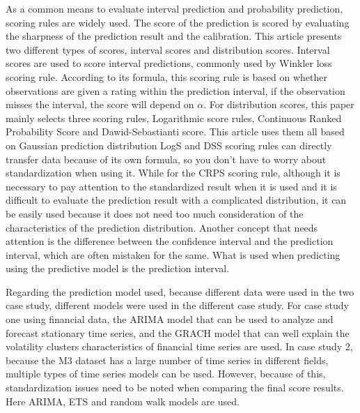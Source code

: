 \documentclass{monashthesis}
\theoremstyle{definition}
\theoremstyle{definition}
\theoremstyle{definition}
\theoremstyle{remark}
\begin{document}
As a common means to evaluate interval prediction and probability
prediction, scoring rules are widely used. The score of the prediction
is scored by evaluating the sharpness of the prediction result and the
calibration. This article presents two different types of scores,
interval scores and distribution scores. Interval scores are used to
score interval predictions, commonly used by Winkler loss scoring rule.
According to its formula, this scoring rule is based on whether
observations are given a rating within the prediction interval, if the
observation misses the interval, the score will depend on \(\alpha\).
For distribution scores, this paper mainly selects three scoring rules,
Logarithmic score rules, Continuous Ranked Probability Score and
Dawid-Sebastianti score. This article uses them all based on Gaussian
prediction distribution LogS and DSS scoring rules can directly transfer
data because of its own formula, so you don't have to worry about
standardization when using it. While for the CRPS scoring rule, although
it is necessary to pay attention to the standardized result when it is
used and it is difficult to evaluate the prediction result with a
complicated distribution, it can be easily used because it does not need
too much consideration of the characteristics of the prediction
distribution. Another concept that needs attention is the difference
between the confidence interval and the prediction interval, which are
often mistaken for the same. What is used when predicting using the
predictive model is the prediction interval.

Regarding the prediction model used, because different data were used in
the two case study, different models were used in the different case
study. For case study one using financial data, the ARIMA model that can
be used to analyze and forecast stationary time series, and the GRACH
model that can well explain the volatility clusters characteristics of
financial time series are used. In case study 2, because the M3 dataset
has a large number of time series in different fields, multiple types of
time series models can be used. However, because of this,
standardization issues need to be noted when comparing the final score
results. Here ARIMA, ETS and random walk models are used.
\end{document}
